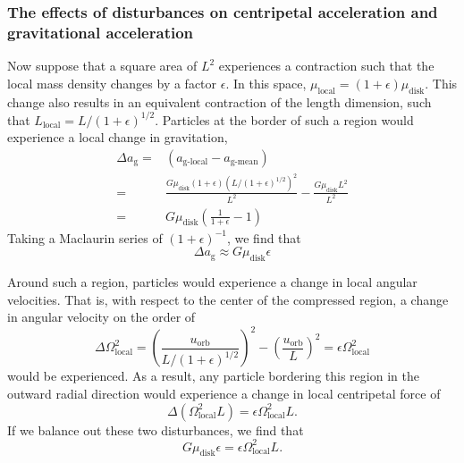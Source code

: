 \documentclass[aps,pra, twocolumn]{revtex4-1}
\begin{document}
\subsubsection{\label{section 3.1.1} The effects of disturbances on centripetal acceleration and gravitational acceleration}
Now suppose that a square area of $L^2$ experiences a contraction such that the local mass density changes by a factor $\epsilon$.  In this space, $\mu_{\text{local}} = (1+\epsilon) \mu_{\text{disk}}$. This change also results in an equivalent contraction of the length dimension, such that $L_\text{local} = L/(1 + \epsilon)^{1/2}$. Particles at the border of such a region would experience a local change in gravitation,
\begin{equation}
\begin{split}
\Delta a_{\text{g}} =&(a_{\text{g-local}} - a_{\text{g-mean}}) \\
=&\frac{G\mu_\text{disk} (1 + \epsilon) (L/(1 + \epsilon)^{1/2})^2}{L^2} - \frac{G\mu_{\text{disk}} L^2}{L^2}
\\
=&G \mu_{\text{disk}}\left(\frac{1}{1 + \epsilon} - 1  \right) \nonumber
\end{split}
\end{equation}
Taking a Maclaurin series of $(1 + \epsilon)^{-1}$, we find that \cite{toomre1964}
\begin{equation}
\Delta a_\text{g} \approx G\mu_\text{disk}\epsilon
\end{equation}

Around such a region, particles would experience a change in local angular velocities.  That is, with respect to the center of the compressed region, a change in angular velocity on the order of 
\begin{equation}
\Delta \Omega_\text{local}^2 = \left(\frac{u_\text{orb}}{L/(1+\epsilon)^{1/2}}\right)^2 - \left(\frac{u_\text{orb}}{L}\right)^2 =  \epsilon\Omega_\text{local}^2 \nonumber
\end{equation}
would be experienced.  As a result, any particle bordering this region in the outward radial direction would experience a change in local centripetal force of \cite{toomre1964}
\begin{equation}
\Delta (\Omega_\text{local}^2 L) = \epsilon \Omega_\text{local}^2 L.
\end{equation}
If we balance out these two disturbances, we find that 
\begin{equation}
G \mu_\text{disk} \epsilon = \epsilon \Omega_\text{local}^2 L. \nonumber
\end{equation}
\end{document}
